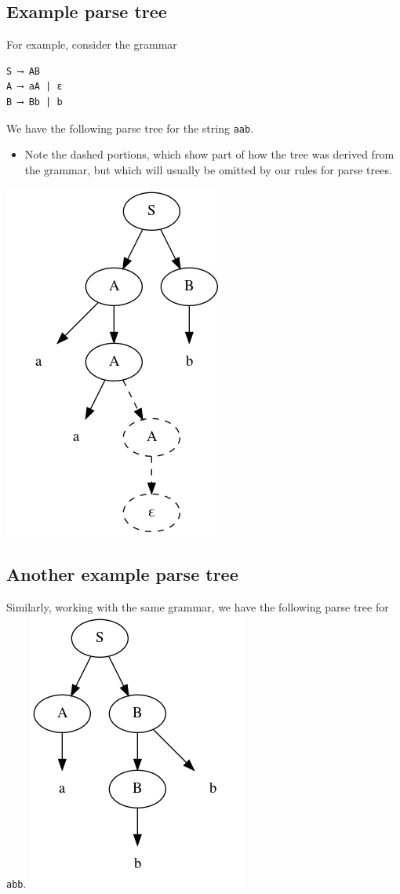 \documentclass[11pt]{article}
\theoremstyle{definition}
\begin{document}
\subsection{Example parse tree}
\label{sec:org691da27}
For example, consider the grammar
\begin{verbatim}
S ⟶ AB
A ⟶ aA | ε
B ⟶ Bb | b
\end{verbatim}

We have the following parse tree for the string \texttt{aab}.
\begin{itemize}
\item Note the dashed portions, which show part of how the tree
was derived from the grammar,
but which will usually be omitted by our rules for parse trees.
\end{itemize}
\includegraphics{media/parse-tree-example-aab.png}

\subsection{Another example parse tree}
\label{sec:org5b83cf4}
Similarly, working with the same grammar,
we have the following parse tree for \texttt{abb}.
\includegraphics{media/parse-tree-example-abb.png}
\end{document}

